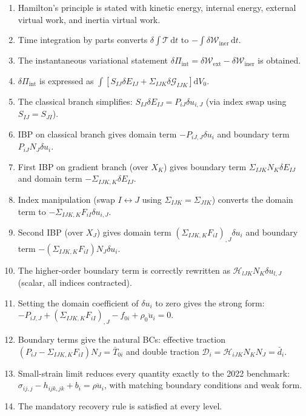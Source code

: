 \documentclass[11pt]{article}
\begin{document}
\begin{enumerate}
\item Hamilton's principle is stated with kinetic energy, internal
energy, external virtual work, and inertia virtual work.

\item Time integration by parts converts $\delta\int\mathcal{T}\,\mathrm{d}t$
to $-\int\delta\mathcal{W}_{\mathrm{iner}}\,\mathrm{d}t$.

\item The instantaneous variational statement
$\delta\Pi_{\mathrm{int}} = \delta\mathcal{W}_{\mathrm{ext}}
- \delta\mathcal{W}_{\mathrm{iner}}$ is obtained.

\item $\delta\Pi_{\mathrm{int}}$ is expressed as
$\int[S_{IJ}\delta E_{IJ}+\Sigma_{IJK}\delta\mathcal{G}_{IJK}]\mathrm{d}V_0$.

\item The classical branch simplifies: $S_{IJ}\delta E_{IJ}
= P_{iJ}\delta u_{i,J}$ (via index swap using $S_{IJ}=S_{JI}$).

\item IBP on classical branch gives domain term $-P_{iJ,J}\delta u_i$
and boundary term $P_{iJ}N_J\delta u_i$.

\item First IBP on gradient branch (over $X_K$) gives boundary term
$\Sigma_{IJK}N_K\delta E_{IJ}$ and domain term
$-\Sigma_{IJK,K}\delta E_{IJ}$.

\item Index manipulation (swap $I\leftrightarrow J$ using
$\Sigma_{IJK}=\Sigma_{JIK}$) converts the domain term to
$-\Sigma_{IJK,K}F_{iI}\delta u_{i,J}$.

\item Second IBP (over $X_J$) gives domain term
$(\Sigma_{IJK,K}F_{iI})_{,J}\delta u_i$ and boundary term
$-(\Sigma_{IJK,K}F_{iI})N_J\delta u_i$.

\item The higher-order boundary term is correctly rewritten as
$\mathcal{H}_{lJK}N_K\delta u_{l,J}$ (scalar, all indices contracted).

\item Setting the domain coefficient of $\delta u_i$ to zero gives
the strong form:
$-P_{iJ,J}+(\Sigma_{IJK,K}F_{iI})_{,J}-f_{0i}+\rho_0\ddot{u}_i=0$.

\item Boundary terms give the natural BCs:
effective traction $(P_{iJ}-\Sigma_{IJK,K}F_{iI})N_J=\bar{T}_{0i}$
and double traction $\mathcal{D}_i=\mathcal{H}_{iJK}N_KN_J=\bar{d}_i$.

\item Small-strain limit reduces every quantity exactly to the
2022 benchmark: $\sigma_{ij,j}-h_{ijk,jk}+b_i=\rho\ddot{u}_i$, with
matching boundary conditions and weak form.

\item The mandatory recovery rule is satisfied at every level.
\end{enumerate}
\end{document}
